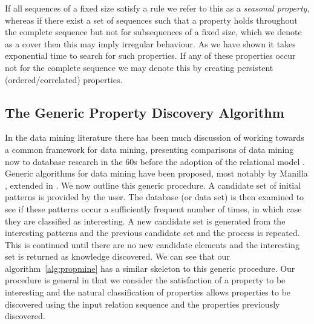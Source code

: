 \medskip

If all sequences of a
fixed size satisfy a rule we refer to this as a {\em seasonal property},
whereas if there exist a set of sequences such that a property holds
throughout the complete sequence but not for subsequences of a fixed
size, which we denote as a cover then this may imply irregular
behaviour. As we have shown it takes exponential time to search for
such properties.
If any of these properties occur not for the complete sequence we
may denote this by creating persistent (ordered/correlated)
properties.



\subsection{The Generic Property Discovery Algorithm}\label{subsec:tr_genalg}

In the data mining literature there has been much discussion of
working towards a common framework for data mining, presenting
comparisons of data mining now to database research in the 60s before
the adoption of the relational model \cite{fps96b,man96}. Generic algorithms for data
mining have been proposed, most notably by Manilla \cite{man96},
extended in \cite{man97}. We now outline this generic procedure. A
candidate set of initial patterns is provided by the user. The
database (or data set) is then examined to see if these patterns occur
a sufficiently frequent number of times, in which case they are
classified as interesting. A new candidate set is generated from the
interesting patterns and the previous candidate set and the process is
repeated. This is continued until there are no new candidate elements
and the interesting set is returned as knowledge discovered. We can
see that our algorithm~\ref{alg:propmine} has a similar skeleton to
this generic procedure. Our procedure is general in that we consider
the satisfaction of a property to be interesting and the natural
classification of properties allows properties to be discovered using
the input relation sequence and the properties previously discovered. 

